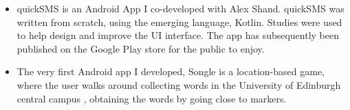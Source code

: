 \documentclass[9pt,a4paper]{altacv}
\begin{document}
\begin{itemize}
\item quickSMS is an Android App I co-developed with Alex Shand. quickSMS was written from scratch, using the emerging language, Kotlin. Studies were used to help design and improve the UI interface. The app has subsequently been published on the Google Play store for the public to enjoy.
\end{itemize}
\divider

\begin{itemize}
\item The very first Android app I developed, Songle is a location-based game, where the user walks around collecting words in the University of Edinburgh central campus , obtaining the words by going close to markers.
\end{itemize}
\end{document}
